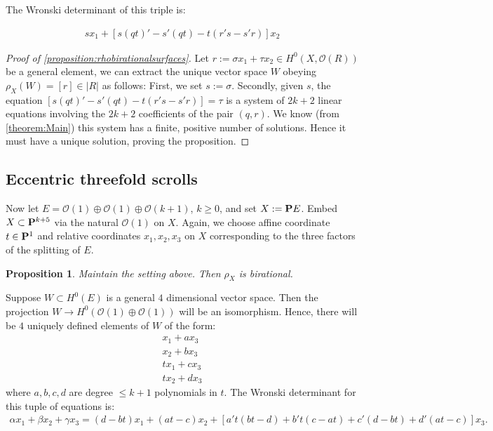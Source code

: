 \documentclass[11pt,reqno]{amsart}
\theoremstyle{plain}
\newtheorem{proposition}[theorem]{Proposition}
\theoremstyle{definition}
\theoremstyle{remark}
\numberwithin{equation}{section}
\renewcommand{\to}{{\longrightarrow}}
\numberwithin{equation}{section}
\renewcommand{\O}{\mathcal O}
\begin{document}
The Wronski determinant of this triple is: 

\begin{align}\label{equation:jacobsurface}
	sx_{1} + \left[s(qt)' - s'(qt) - t(r's-s'r)\right]x_{2}
\end{align}

\begin{proof}[Proof of \autoref{proposition:rhobirationalsurfaces}]
	Let $r := \sigma x_{1} + \tau x_{2} \in H^{0}(X,\O(R))$ be a general element, we can extract the unique vector space $W$ obeying $\rho_{X}(W) = [r] \in |R|$ as follows: First, we set $s := \sigma$. Secondly, given $s$, the equation $\left[s(qt)' - s'(qt) - t(r's-s'r)\right] = \tau$ is a system of $2k+2$ linear equations involving the $2k+2$ coefficients of the pair $(q,r)$. We know (from \autoref{theorem:Main})  this system has a finite, positive number of solutions. Hence it must have a unique solution, proving the proposition.
\end{proof}

\subsection{Eccentric threefold scrolls} %
\label{sub:eccentric_threefolds}
Now let $E = \O(1) \oplus \O(1) \oplus \O(k+1)$, $k \geq 0$, and set $X := \P E$.  Embed $X \subset \P^{k+5}$ via the natural $\O(1)$ on $X$. Again, we choose affine coordinate $t \in \P^{1}$ and relative coordinates $x_{1},x_{2},x_{3}$ on $X$ corresponding to the three factors of the splitting of $E$. 

\begin{proposition}\label{proposition:threefold}
Maintain the setting above. Then	$\rho_{X}$ is birational.
\end{proposition}

Suppose $W \subset H^{0}(E)$ is a general $4$ dimensional vector space. Then the projection $W \to H^{0}(\O(1)\oplus \O(1))$ will be an isomorphism.  Hence, there will be $4$ uniquely defined elements of $W$ of the form: 
\begin{align*}
	x_{1} + ax_{3}\\
	x_{2} + bx_{3}\\
	tx_{1} + cx_{3}\\
	tx_{2} + d x_{3}
\end{align*}
where $a,b,c,d$ are degree $\leq k+1$ polynomials in $t$.
The Wronski determinant for this tuple of equations is: 
\begin{align}\label{eq:jacobianthreefold}
	\alpha x_{1} + \beta x_{2} + \gamma x_{3} = (d-bt)x_{1} + (at-c)x_{2} + \left[a't(bt-d) + b't(c-at) + c'(d-bt)+ d'(at-c) \right]x_{3}.
\end{align}
\end{document}
